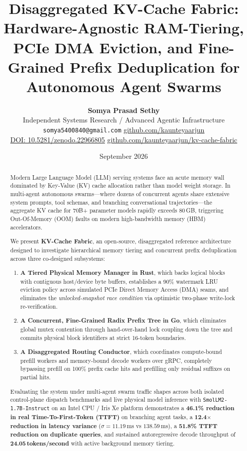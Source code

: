 \documentclass[10pt,twocolumn,letterpaper]{article}
\title{\Large\textbf{Disaggregated KV-Cache Fabric: Hardware-Agnostic RAM-Tiering, PCIe DMA Eviction, and Fine-Grained Prefix Deduplication for Autonomous Agent Swarms}}
\author{
  \textbf{Somya Prasad Sethy} \\
  Independent Systems Research / Advanced Agentic Infrastructure \\
  \texttt{somya5400840@gmail.com} \quad \href{https://github.com/kaunteyaarjun}{github.com/kaunteyaarjun} \\
  \href{https://doi.org/10.5281/zenodo.22966805}{DOI: 10.5281/zenodo.22966805} \quad \href{https://github.com/kaunteyaarjun/kv-cache-fabric}{github.com/kaunteyaarjun/kv-cache-fabric}
}
\date{September 2026}
\begin{document}
\maketitle

\begin{abstract}
Modern Large Language Model (LLM) serving systems face an acute memory wall dominated by Key-Value (KV) cache allocation rather than model weight storage. In multi-agent autonomous swarms---where dozens of concurrent agents share extensive system prompts, tool schemas, and branching conversational trajectories---the aggregate KV cache for 70B+ parameter models rapidly exceeds 80\,GB, triggering Out-Of-Memory (OOM) faults on modern high-bandwidth memory (HBM) accelerators. 

We present \textbf{KV-Cache Fabric}, an open-source, disaggregated reference architecture designed to investigate hierarchical memory tiering and concurrent prefix deduplication across three co-designed subsystems:
\begin{enumerate}
    \item \textbf{A Tiered Physical Memory Manager in Rust}, which backs logical blocks with contiguous host/device byte buffers, establishes a 90\% watermark LRU eviction policy across simulated PCIe Direct Memory Access (DMA) seams, and eliminates the \textit{unlocked-snapshot race condition} via optimistic two-phase write-lock re-verification.
    \item \textbf{A Concurrent, Fine-Grained Radix Prefix Tree in Go}, which eliminates global mutex contention through hand-over-hand lock coupling down the tree and commits physical block identifiers at strict 16-token boundaries.
    \item \textbf{A Disaggregated Routing Conductor}, which coordinates compute-bound prefill workers and memory-bound decode workers over gRPC, completely bypassing prefill on 100\% prefix cache hits and prefilling only residual suffixes on partial hits.
\end{enumerate}
Evaluating the system under multi-agent swarm traffic shapes across both isolated control-plane dispatch benchmarks and live physical model inference with \texttt{SmolLM2-1.7B-Instruct} on an Intel CPU / Iris Xe platform demonstrates a \textbf{46.1\% reduction in real Time-To-First-Token (TTFT)} on branching agent tasks, a \textbf{12.4$\times$ reduction in latency variance} ($\sigma = 11.19\,\text{ms}$ vs $138.59\,\text{ms}$), a \textbf{51.8\% TTFT reduction on duplicate queries}, and sustained autoregressive decode throughput of \textbf{24.05\,tokens/second} with active background memory tiering.
\end{abstract}
\end{document}

